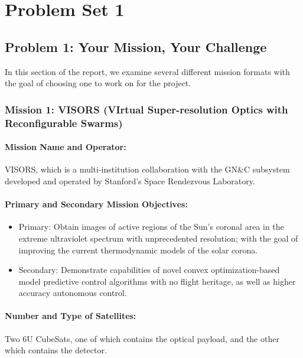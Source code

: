 \section{Problem Set 1}
\subsection{Problem 1: Your Mission, Your Challenge}

In this section of the report, we examine several different mission formats with the goal of choosing one to work on for the project.

\subsubsection{Mission 1: VISORS (VIrtual Super-resolution Optics with Reconfigurable Swarms)}

\paragraph{Mission Name and Operator:} VISORS, which is a multi-institution collaboration with the GN\&C subsystem developed and operated by Stanford's Space Rendezvous Laboratory.

\paragraph{Primary and Secondary Mission Objectives:}
\begin{itemize}
    \item Primary: Obtain images of active regions of the Sun's coronal area in the extreme ultraviolet spectrum with unprecedented resolution; with the goal of improving the current thermodynamic models of the solar corona.
    \item Secondary: Demonstrate capabilities of novel convex optimization-based model predictive control algorithms with no flight heritage, as well as higher accuracy autonomous control. 
\end{itemize}

\paragraph{Number and Type of Satellites:} 
Two 6U CubeSats, one of which contains the optical payload, and the other which contains the detector.

